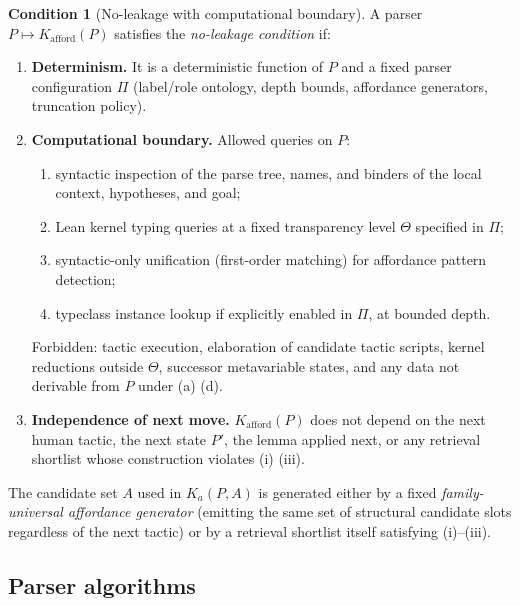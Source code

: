 \documentclass[11pt]{article}
\theoremstyle{definition}
\newtheorem{condition}[definition]{Condition}
\theoremstyle{plain}
\newcommand{\Kafford}{K_{\mathrm{afford}}}
\begin{document}
\begin{condition}[No-leakage with computational boundary]\label{cond:noleak}
A parser $P \mapsto \Kafford(P)$ satisfies the \emph{no-leakage condition} if:
\begin{enumerate}[label=(\roman*)]
\item \textbf{Determinism.} It is a deterministic function of $P$ and a fixed parser configuration $\Pi$ (label/role ontology, depth bounds, affordance generators, truncation policy).
\item \textbf{Computational boundary.} Allowed queries on $P$:
\begin{enumerate}[label=(\alph*)]
\item syntactic inspection of the parse tree, names, and binders of the local context, hypotheses, and goal;
\item Lean kernel typing queries at a fixed transparency level $\Theta$ specified in $\Pi$;
\item syntactic-only unification (first-order matching) for affordance pattern detection;
\item typeclass instance lookup if explicitly enabled in $\Pi$, at bounded depth.
\end{enumerate}
Forbidden: tactic execution, elaboration of candidate tactic scripts, kernel reductions outside $\Theta$, successor metavariable states, and any data not derivable from $P$ under (a) (d).
\item \textbf{Independence of next move.} $\Kafford(P)$ does not depend on the next human tactic, the next state $P'$, the lemma applied next, or any retrieval shortlist whose construction violates (i) (iii).
\end{enumerate}
The candidate set $A$ used in $K_a(P, A)$ is generated either by a fixed \emph{family-universal affordance generator} (emitting the same set of structural candidate slots regardless of the next tactic) or by a retrieval shortlist itself satisfying (i)--(iii).
\end{condition}

\subsection{Parser algorithms}\label{sec:parser}
\end{document}

